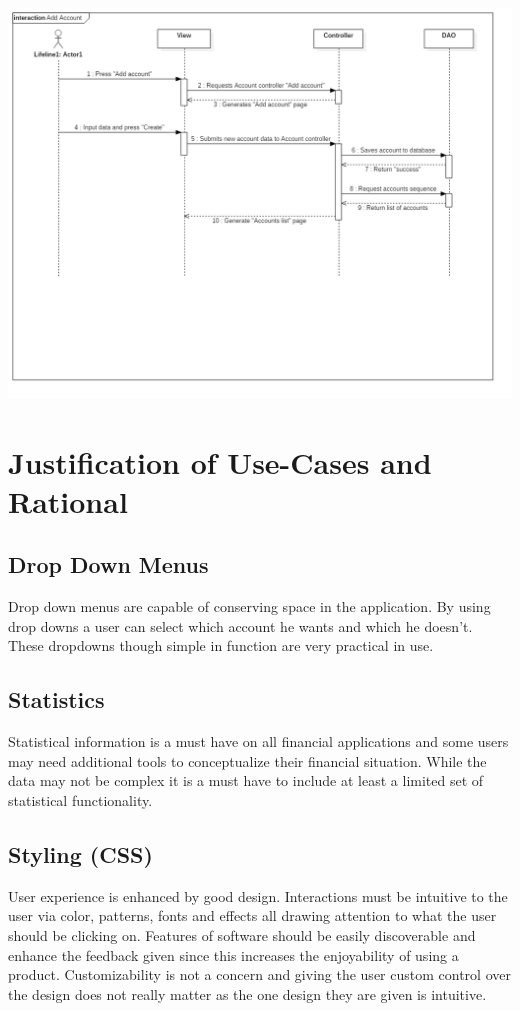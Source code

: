 \documentclass[12pt]{article}
\begin{document}
\includegraphics[width=\graphicwidth]{Add_Account}

\section{Justification of Use-Cases and Rational}
\subsection{Drop Down Menus}
	Drop down menus are capable of conserving space in the application. By using drop downs a user can select which account he wants and which he doesn't. These dropdowns though simple in function are very practical in use.
\subsection{Statistics}
	 Statistical information is a must have on all financial applications and some users may need additional tools to conceptualize their financial situation. While the data may not be complex it is a must have to include at least a limited set of statistical functionality.
\subsection{Styling (CSS)}
	User experience is enhanced by good design. Interactions must be intuitive to the user via color, patterns, fonts and effects all drawing attention to what the user should be clicking on. Features of software should be easily discoverable and enhance the feedback given since this increases the enjoyability of using a product. Customizability is not a concern and giving the user custom control over the design does not really matter as the one design they are given is intuitive.
\end{document}
